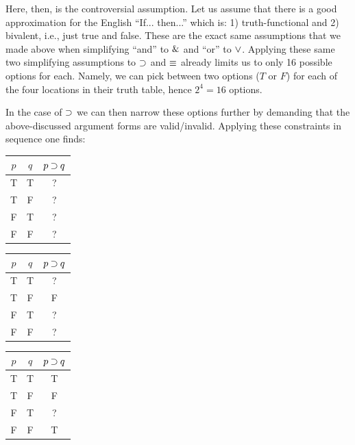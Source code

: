 \documentclass[options]{philosophersimprint}
\theoremstyle{definition}
\begin{document}
Here, then, is the controversial assumption. Let us assume that there is a good approximation for the English ``If... then...'' which is: 1) truth-functional and 2) bivalent, i.e., just true and false. These are the exact same assumptions that we made above when simplifying ``and'' to $\mathbin{\&}$ and ``or'' to $\mathbin{\vee}$. Applying these same two simplifying assumptions to $\mathbin{\supset}$ and $\mathbin{\equiv}$ already limits us to only 16 possible options for each. Namely, we can pick between two options ($T$ or $F$) for each of the four locations in their truth table, hence $2^4=16$ options.

In the case of $\mathbin{\supset}$ we can then narrow these options further by demanding that the above-discussed argument forms are valid/invalid. Applying these constraints in sequence one finds:
\begin{table}[h!]
    \centering
    \begin{tabular}{c c| c}
        $p$ & $q$ & $p\mathbin{\supset} q$ \\
        \hline
        T & T & ? \\
        T & F & ?\\
        F & T & ?\\
        F & F & ?\\
    \end{tabular}
    \hspace{.5cm}
    \begin{tabular}{c c| c}
        $p$ & $q$ & $p \mathbin{\supset} q$ \\
        \hline
        T & T & ? \\
        T & F & F\\
        F & T & ?\\
        F & F & ?\\
    \end{tabular}
    \hspace{.5cm}
    \begin{tabular}{c c| c}
        $p$ & $q$ & $p \mathbin{\supset} q$ \\
        \hline
        T & T & T \\
        T & F & F\\
        F & T & ?\\
        F & F & T\\
    \end{tabular}
\end{table}
\end{document}
